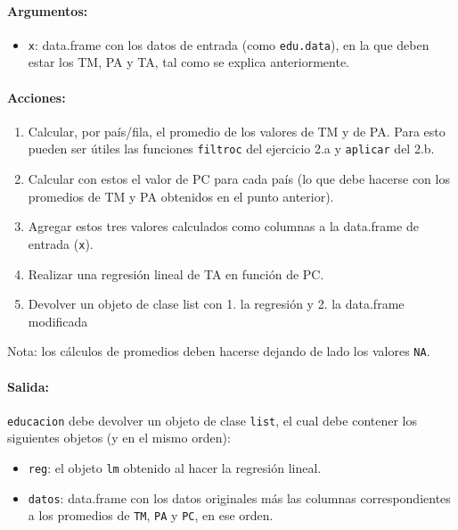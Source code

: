 \documentclass[]{article}
\begin{document}
\paragraph{Argumentos:}

\begin{itemize}
\item
  \texttt{x}: data.frame con los datos de entrada (como
  \texttt{edu.data}), en la que deben estar los TM, PA y TA, tal como se
  explica anteriormente.
\end{itemize}

\paragraph{Acciones:}

\begin{enumerate}[1.]
\item
  Calcular, por país/fila, el promedio de los valores de TM y de PA.
  Para esto pueden ser útiles las funciones \texttt{filtroc} del
  ejercicio 2.a y \texttt{aplicar} del 2.b.
\item
  Calcular con estos el valor de PC para cada país (lo que debe hacerse
  con los promedios de TM y PA obtenidos en el punto anterior).
\item
  Agregar estos tres valores calculados como columnas a la data.frame de
  entrada (\texttt{x}).
\item
  Realizar una regresión lineal de TA en función de PC.
\item
  Devolver un objeto de clase list con 1. la regresión y 2. la
  data.frame modificada
\end{enumerate}

Nota: los cálculos de promedios deben hacerse dejando de lado los
valores \texttt{NA}.

\paragraph{Salida:}

\texttt{educacion} debe devolver un objeto de clase \texttt{list}, el
cual debe contener los siguientes objetos (y en el mismo orden):

\begin{itemize}
\item
  \texttt{reg}: el objeto \texttt{lm} obtenido al hacer la regresión
  lineal.
\item
  \texttt{datos}: data.frame con los datos originales más las columnas
  correspondientes a los promedios de \texttt{TM}, \texttt{PA} y
  \texttt{PC}, en ese orden.
\end{itemize}
\end{document}
